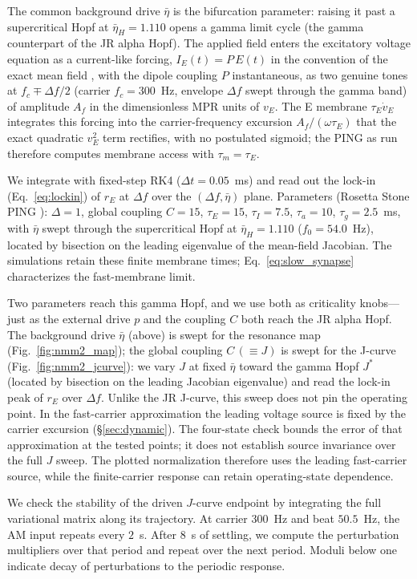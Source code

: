 \documentclass[11pt,a4paper]{article}
\begin{document}
The common background drive $\bar\eta$ is the bifurcation parameter: raising it
past a supercritical Hopf at $\bar\eta_H=1.110$ opens a gamma limit cycle (the gamma
counterpart of the JR alpha Hopf). The applied field enters the excitatory voltage equation
as a current-like forcing, $I_E(t)=P\,E(t)$ in the convention of the exact mean field
\cite{ruffini2021nmm2}, with the dipole coupling $P$ instantaneous, as two genuine tones at
$f_c\mp\Delta f/2$ (carrier $f_c=300$~Hz, envelope $\Delta f$ swept through the gamma band)
of amplitude $A_f$ in the dimensionless MPR units of $v_E$. The E membrane $\tau_E\dot v_E$
integrates this forcing into the carrier-frequency excursion $A_f/(\omega\tau_E)$ that the
exact quadratic $v_E^2$ term rectifies, with no postulated sigmoid; the PING as run
therefore computes membrane access with $\tau_m=\tau_E$.

We integrate with fixed-step RK4 ($\Delta t=0.05$~ms) and read out the lock-in
(Eq.~\eqref{eq:lockin}) of $r_E$ at $\Delta f$ over the $(\Delta f, \bar\eta)$ plane.
Parameters (Rosetta Stone PING \cite{ruffini2025rosetta}): $\Delta=1$, global coupling
$C=15$, $\tau_E=15$, $\tau_I=7.5$, $\tau_a=10$, $\tau_g=2.5$~ms, with $\bar\eta$ swept
through the supercritical Hopf at $\bar\eta_H=1.110$ ($f_0=54.0$~Hz), located by bisection
on the leading eigenvalue of the mean-field Jacobian. The simulations retain these
finite membrane times; Eq.~\eqref{eq:slow_synapse} characterizes the fast-membrane limit.

Two parameters reach this gamma Hopf, and we use both as criticality knobs---just as the
external drive $p$ and the coupling $C$ both reach the JR alpha Hopf. The background drive
$\bar\eta$ (above) is swept for the resonance map (Fig.~\ref{fig:nmm2_map}); the global
coupling $C\,(\equiv J)$ is swept for the J-curve (Fig.~\ref{fig:nmm2_jcurve}): we vary
$J$ at fixed $\bar\eta$ toward the gamma Hopf $J^*$ (located by bisection on the leading
Jacobian eigenvalue) and read the lock-in peak of $r_E$ over $\Delta f$. Unlike the JR
J-curve, this sweep does not pin the operating point. In the fast-carrier
approximation the leading voltage source is fixed by the carrier excursion
(\S\ref{sec:dynamic}). The four-state check bounds the error of that approximation
at the tested points; it does not establish source invariance over the full $J$
sweep. The plotted normalization therefore uses the leading fast-carrier source,
while the finite-carrier response can retain operating-state dependence.

We check the stability of the driven $J$-curve endpoint by integrating the full
variational matrix along its trajectory. At carrier $300$~Hz and beat $50.5$~Hz,
the AM input repeats every $2$~s. After $8$~s of settling, we compute the
perturbation multipliers over that period and repeat over the next period.
Moduli below one indicate decay of perturbations to the periodic response.
\end{document}
